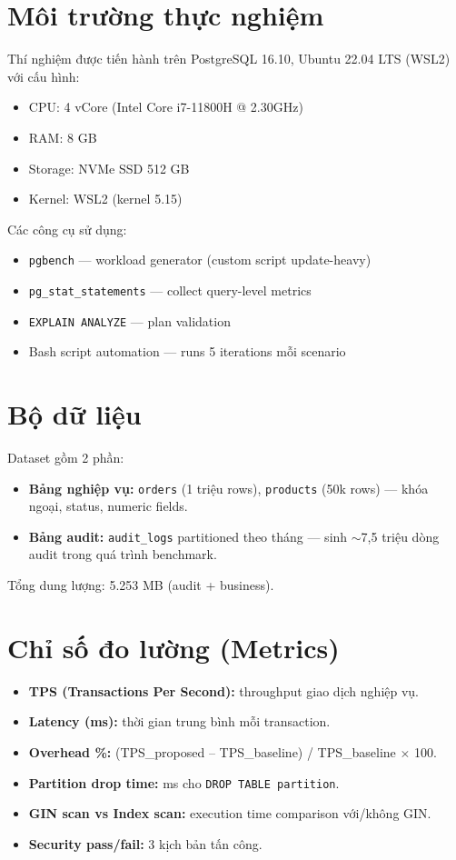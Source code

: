 \section{Môi trường thực nghiệm}

Thí nghiệm được tiến hành trên PostgreSQL 16.10, Ubuntu 22.04 LTS (WSL2) với cấu hình:
\begin{itemize}
    \item CPU: 4 vCore (Intel Core i7-11800H @ 2.30GHz)
    \item RAM: 8 GB
    \item Storage: NVMe SSD 512 GB
    \item Kernel: WSL2 (kernel 5.15)
\end{itemize}

Các công cụ sử dụng:
\begin{itemize}
    \item \texttt{pgbench} --- workload generator (custom script update-heavy)
    \item \texttt{pg\_stat\_statements} --- collect query-level metrics
    \item \texttt{EXPLAIN\ ANALYZE} --- plan validation
    \item Bash script automation --- runs 5 iterations mỗi scenario
\end{itemize}

\section{Bộ dữ liệu}

Dataset gồm 2 phần:
\begin{itemize}
    \item \textbf{Bảng nghiệp vụ:} \texttt{orders} (1 triệu rows), \texttt{products} (50k rows) --- khóa ngoại, status, numeric fields.
    \item \textbf{Bảng audit:} \texttt{audit\_logs} partitioned theo tháng --- sinh $\sim$7,5 triệu dòng audit trong quá trình benchmark.
\end{itemize}

Tổng dung lượng: 5.253 MB (audit + business).

\section{Chỉ số đo lường (Metrics)}

\begin{itemize}
    \item \textbf{TPS (Transactions Per Second):} throughput giao dịch nghiệp vụ.
    \item \textbf{Latency (ms):} thời gian trung bình mỗi transaction.
    \item \textbf{Overhead \%:} (TPS\_proposed -- TPS\_baseline) / TPS\_baseline $\times$ 100.
    \item \textbf{Partition drop time:} ms cho \texttt{DROP\ TABLE\ partition}.
    \item \textbf{GIN scan vs Index scan:} execution time comparison với/không GIN.
    \item \textbf{Security pass/fail:} 3 kịch bản tấn công.
\end{itemize}


